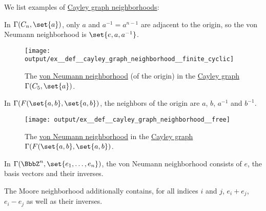 \begin{example}\label{ex:def:cayley_graph_neighborhood}
  We list examples of \hyperref[def:cayley_graph_neighborhood]{Cayley graph neighborhoods}:
  \begin{thmenum}
     In \( \Gamma(C_n, \set{ a }) \), only \( a \) and \( a^{-1} = a^{n-1} \) are adjacent to the origin, so the von Neumann neighborhood is \( \set{ e, a, a^{-1} } \).

    \begin{figure}[!ht]
      \centering
      \texttt{[image: output/ex\_\_def\_\_cayley\_graph\_neighborhood\_\_finite\_cyclic]}
      \caption{The \hyperref[def:cayley_graph_neighborhood/von_neumann]{von Neumann neighborhood} (of the origin) in the \hyperref[def:cayley_graph]{Cayley graph} \( \Gamma(C_5, \set{ a }) \).}\label{fig:ex:def:cayley_graph_neighborhood/finite_cyclic}
    \end{figure}

     In \( \Gamma(F(\set{ a, b }, \set{ a, b }) \), the neighbors of the origin are \( a \), \( b \), \( a^{-1} \) and \( b^{-1} \).

    \begin{figure}[!ht]
      \centering
      \texttt{[image: output/ex\_\_def\_\_cayley\_graph\_neighborhood\_\_free]}
      \caption{The \hyperref[def:cayley_graph_neighborhood/von_neumann]{von Neumann neighborhood} in the \hyperref[def:cayley_graph]{Cayley graph} \( \Gamma(F(\set{ a, b }, \set{ a, b }) \).}\label{fig:ex:def:cayley_graph_neighborhood/free}
    \end{figure}

     In \( \Gamma(\BbbZ^n, \set{ e_1, \ldots, e_n }) \), the von Neumann neighborhood consists of \( e \), the basis vectors and their inverses.

    The Moore neighborhood additionally contains, for all indices \( i \) and \( j \), \( e_i + e_j \), \( e_i - e_j \) as well as their inverses.


\end{thmenum}
\end{example}
